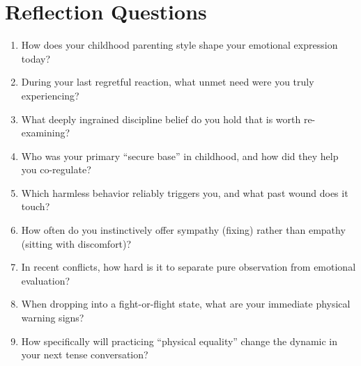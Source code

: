 \section{Reflection Questions}

\begin{reflection}
\small
\begin{enumerate}[itemsep=0pt, parsep=0pt, topsep=0pt]
  \item How does your childhood parenting style shape your emotional expression today?
  \item During your last regretful reaction, what unmet need were you truly experiencing?
  \item What deeply ingrained discipline belief do you hold that is worth re-examining?
  \item Who was your primary ``secure base'' in childhood, and how did they help you co-regulate?
  \item Which harmless behavior reliably triggers you, and what past wound does it touch?
  \item How often do you instinctively offer sympathy (fixing) rather than empathy (sitting with discomfort)?
  \item In recent conflicts, how hard is it to separate pure observation from emotional evaluation?
  \item When dropping into a fight-or-flight state, what are your immediate physical warning signs?
  \item How specifically will practicing ``physical equality'' change the dynamic in your next tense conversation?
\end{enumerate}
\end{reflection}
